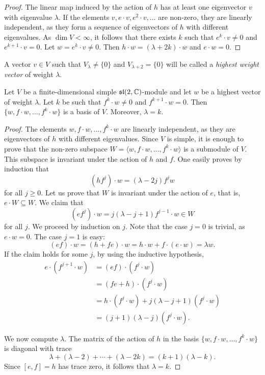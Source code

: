 \begin{proof}
    The linear map induced by the action of $h$ has at least one eigenvector 
    $v$ with eigenvalue $\lambda$. If the elements 
    $v,e\cdot v,e^2\cdot v,\dots$ are non-zero, they are linearly independent, as they 
    form a sequence of eigenvectors of $h$ with different eigenvalues.  
    As $\dim V<\infty$, it follows that there exists $k$ 
    such that $e^k\cdot v\ne 0$ and $e^{k+1}\cdot v=0$. 
    Let $w=e^k\cdot v\ne 0$. 
    Then
    $h\cdot w=(\lambda+2k)\cdot w$ and $e\cdot w=0$. 
\end{proof}

A vector $v\in V$ such that $V_{\lambda}\ne\{0\}$ and
$V_{\lambda+2}=\{0\}$ will be called a \emph{highest weight vector} 
of weight $\lambda$. 

\begin{lemma}
\label{lem:basis}
    Let $V$ be a finite-dimensional simple $\mathfrak{sl}(2,\mathbb{C})$-module
    and let $w$ be a highest vector of weight $\lambda$. Let 
    $k$ be such that $f^k\cdot w\ne 0$ and $f^{k+1}\cdot w=0$.
    Then $\{w,f\cdot w,\dots,f^{k}\cdot w\}$ is a basis of $V$.
    Moreover, $\lambda=k$.
\end{lemma}

\begin{proof}
    The elements $w,f\cdot w,\dots,f^{k}\cdot w$ 
    are linearly independent, as they are eigenvectors of $h$ with 
    different eigenvalues. Since $V$ is simple, it is enough 
    to prove that 
    the non-zero subspace $W=\langle w,f\cdot w,\dots,f^k\cdot w\rangle$ 
    is a submodule of $V$. This subspace 
    is invariant under the action of 
    $h$ and $f$. One easily proves by induction that 
    \[
    (hf^j)\cdot w=(\lambda-2j)f^jw
    \]
    for all $j\geq0$. 
    Let us prove that $W$ is invariant 
    under the action of $e$, that is, $e\cdot W\subseteq W$. 
    We claim that 
    \[
    (ef^{j})\cdot w=j(\lambda-j+1)f^{j-1}\cdot w\in W
    \]
    for all $j$. We proceed by induction on $j$. Note that 
    the case $j=0$ is trivial, as $e\cdot w=0$. 
    The case $j=1$ is easy:
    \[
    (ef)\cdot w=(h+fe)\cdot w=h\cdot w+f\cdot (e\cdot w)=\lambda w.
    \]
    If the claim holds for some $j$, by using 
    the inductive hypothesis, 
    \begin{align*}
        e\cdot(f^{j+1}\cdot w)&=(ef)\cdot (f^{j}\cdot w)\\
        &=(fe+h)\cdot (f^{j}\cdot w)\\
        &=h\cdot (f^j\cdot w)+j(\lambda-j+1)(f^j\cdot w)\\
        &=(j+1)(\lambda-j)(f^{j}\cdot w).
    \end{align*}
    
    We now compute $\lambda$. 
    The matrix of the action of $h$ in the basis 
    $\{w,f\cdot w,\dots,f^k\cdot w\}$ 
    is diagonal with trace 
    \[
    \lambda+(\lambda-2)+\cdots+(\lambda-2k)=(k+1)(\lambda-k).
    \]
    Since $[e,f]=h$ has trace zero, it follows that $\lambda=k$. 
\end{proof}

